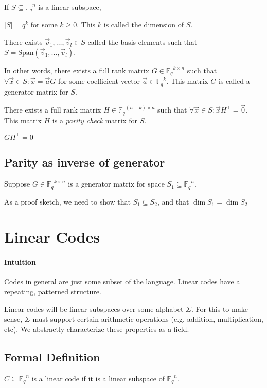 \documentclass{idc_msc}
\newcommand{\Fq}{{\mathbb{F}_q}}
\begin{document}
If \(S \subseteq \Fq^n\) is a linear subspace,

\(|S|=q^k\) for some \(k \ge 0\). This \(k\) is called the dimension of \(S\).

There exists \(\vec{v}_1, \ldots, \vec{v}_l \in S\) called the basis elements such that \(S = \text{Span}(\vec{v}_1,\ldots,\vec{v}_l)\).

In other words, there exists a full rank matrix \(G \in \Fq^{k \times n}\) such that \(\forall \vec{x} \in S : \vec{x} = \vec{a} G\) for some coefficient vector \(\vec{a} \in \Fq^k\). This matrix \(G\) is called a generator matrix for \(S\).

There exists a full rank matrix \(H \in \Fq^{(n-k)\times n}\) such that \(\forall \vec{x} \in S : \vec{x} H^\intercal= \vec{0}\).
This matrix \(H\) is a \emph{parity check} matrix for \(S\).

\(GH^\intercal = 0\)

\subsection{Parity as inverse of generator}

Suppose \(G \in \Fq^{k \times n}\) is a generator matrix for space \(S_1 \subseteq \Fq^n\).

As a proof sketch, we need to show that \(S_1 \subseteq S_2\), and that \(\dim S_1 = \dim S_2\)


\clearpage
\section{Linear Codes}

\paragraph{Intuition}

Codes in general are just some subset of the language.
Linear codes have a repeating, patterned structure.

Linear codes will be linear subspaces over some alphabet \(\Sigma\).
For this to make sense, \(\Sigma\) must support certain arithmetic operations (e.g. addition, multiplication, etc).
We abstractly characterize these properties as a field.

\subsection{Formal Definition}

\(C \subseteq \Fq^n\) is a linear code if it is a linear subspace of \(\Fq^n\).
\end{document}
